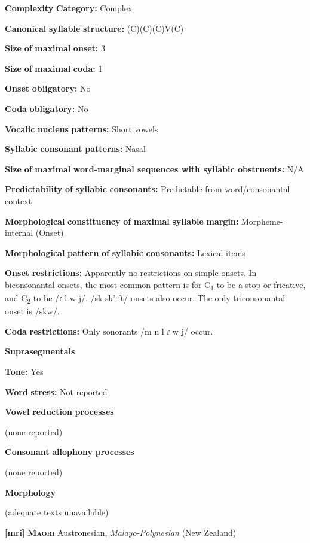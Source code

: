 \textbf{Complexity} \textbf{Category:} Complex

\textbf{Canonical} \textbf{syllable} \textbf{structure:} (C)(C)(C)V(C) \citep[23-24]{Allison2012}

\textbf{Size} \textbf{of} \textbf{maximal} \textbf{onset:} 3

\textbf{Size} \textbf{of} \textbf{maximal} \textbf{coda:} 1

\textbf{Onset} \textbf{obligatory:} No

\textbf{Coda} \textbf{obligatory:} No

\textbf{Vocalic} \textbf{nucleus} \textbf{patterns:} Short vowels

\textbf{Syllabic} \textbf{consonant} \textbf{patterns:} Nasal

\textbf{Size} \textbf{of} \textbf{maximal} \textbf{word{}-marginal sequences with syllabic obstruents:} N/A

\textbf{Predictability} \textbf{of} \textbf{syllabic} \textbf{consonants:} Predictable from word/consonantal context

\textbf{Morphological} \textbf{constituency} \textbf{of} \textbf{maximal} \textbf{syllable} \textbf{margin:} Morpheme-internal (Onset)

\textbf{Morphological} \textbf{pattern} \textbf{of} \textbf{syllabic} \textbf{consonants:} Lexical items

\textbf{Onset} \textbf{restrictions:} Apparently no restrictions on simple onsets. In biconsonantal onsets, the most common pattern is for C\textsubscript{1} to be a stop or fricative, and C\textsubscript{2} to be /ɾ l w j/. /sk sk’ ft/ onsets also occur. The only triconsonantal onset is /skw/.

\textbf{Coda} \textbf{restrictions:} Only sonorants /m n l ɾ w j/ occur.

\textbf{Suprasegmentals}

\textbf{Tone:} Yes

\textbf{Word} \textbf{stress:} Not reported

\textbf{Vowel} \textbf{reduction} \textbf{processes}

(none reported)

\textbf{Consonant} \textbf{allophony} \textbf{processes}

(none reported)

\textbf{Morphology}

(adequate texts unavailable)

\textbf{[mri]}   \textbf{\textsc{Maori}}  Austronesian, \textit{Malayo-Polynesian} (New Zealand)

